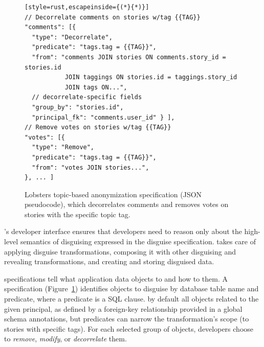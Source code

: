 \begin{figure}[t]
\centering
\begin{lstlisting}[style=rust,escapeinside={(*}{*)}]
// Decorrelate comments on stories w/tag {{TAG}}
"comments": [{
  "type": "Decorrelate",
  "predicate": "tags.tag = {{TAG}}",
  "from": "comments JOIN stories ON comments.story_id = stories.id
           JOIN taggings ON stories.id = taggings.story_id
           JOIN tags ON...",
  // decorrelate-specific fields 
  "group_by": "stories.id",
  "principal_fk": "comments.user_id" } ],
// Remove votes on stories w/tag {{TAG}}
"votes": [{
  "type": "Remove",
  "predicate": "tags.tag = {{TAG}}",
  "from": "votes JOIN stories...",
}, ... ]
\end{lstlisting}
    \caption[Lobsters topic-based anonymization disguise specification.]{Lobsters topic-based anonymization \xx specification (JSON
    pseudocode), which decorrelates comments and removes votes on stories with
    the specific topic tag.}
\label{f:spec}
\end{figure}


\sys's developer interface ensures that developers need to reason only
about the high-level semantics of disguising expressed in the disguise
specification. \sys takes care of applying disguise transformations, composing
it with other disguising and revealing transformations, and creating and storing
disguised data.


\Xx specifications tell \sys what application data objects to \xx and how to \xx
them.
%
A \xx specification (Figure~\ref{f:spec}) identifies objects to disguise by
database table name and predicate, where a predicate is a SQL  clause.
%
\sys by default \xxs all objects related to the given principal, as defined by a
foreign-key relationship provided in a global schema annotations, but
predicates can narrow the transformation's scope (\eg to stories with specific
tags).
%
For each selected group of objects, developers choose to \emph{remove},
\emph{modify}, or \emph{decorrelate} them.
%

